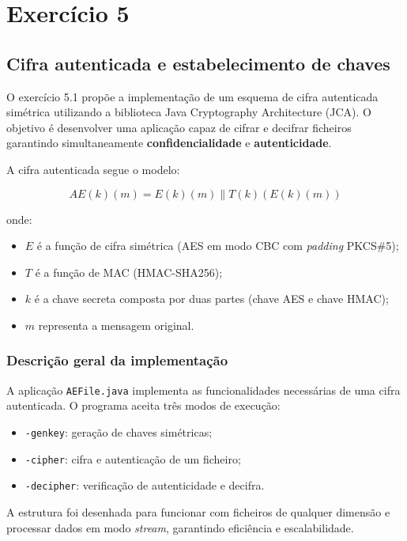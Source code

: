 \chapter{Exercício 5}
\label{cha:exercise_5}


\section{Cifra autenticada e estabelecimento de chaves}

O exercício 5.1 propõe a implementação de um esquema de cifra autenticada simétrica utilizando a biblioteca Java Cryptography Architecture (JCA). O objetivo é desenvolver uma aplicação capaz de cifrar e decifrar ficheiros garantindo simultaneamente \textbf{confidencialidade} e \textbf{autenticidade}. 

A cifra autenticada segue o modelo:

\[
AE(k)(m) = E(k)(m) \parallel T(k)(E(k)(m))
\]

onde:
\begin{itemize}
    \item \(E\) é a função de cifra simétrica (AES em modo CBC com \textit{padding} PKCS\#5);
    \item \(T\) é a função de MAC (HMAC-SHA256);
    \item \(k\) é a chave secreta composta por duas partes (chave AES e chave HMAC);
    \item \(m\) representa a mensagem original.
\end{itemize}


\subsection{Descrição geral da implementação}

A aplicação \texttt{AEFile.java} implementa as funcionalidades necessárias de uma cifra autenticada. O programa aceita três modos de execução:
\begin{itemize}
    \item \texttt{-genkey}: geração de chaves simétricas;
    \item \texttt{-cipher}: cifra e autenticação de um ficheiro;
    \item \texttt{-decipher}: verificação de autenticidade e decifra.
\end{itemize}

A estrutura foi desenhada para funcionar com ficheiros de qualquer dimensão e processar dados em modo \textit{stream}, garantindo eficiência e escalabilidade.


